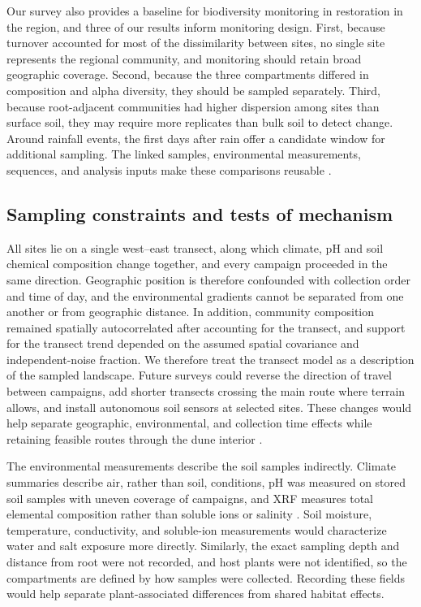 \documentclass[fleqn,10pt,numbers]{olplainarticle}
\begin{document}
Our survey also provides a baseline for biodiversity monitoring in restoration in the region, and three of our results inform monitoring design. First, because turnover accounted for most of the dissimilarity between sites, no single site represents the regional community, and monitoring should retain broad geographic coverage. Second, because the three compartments differed in composition and alpha diversity, they should be sampled separately. Third, because root-adjacent communities had higher dispersion among sites than surface soil, they may require more replicates than bulk soil to detect change. Around rainfall events, the first days after rain offer a candidate window for additional sampling. The linked samples, environmental measurements, sequences, and analysis inputs make these comparisons reusable \cite{rubalkhali_datapaper}.


\subsection*{Sampling constraints and tests of mechanism}

All sites lie on a single west--east transect, along which climate, pH and soil chemical composition change together, and every campaign proceeded in the same direction. Geographic position is therefore confounded with collection order and time of day, and the environmental gradients cannot be separated from one another or from geographic distance. In addition, community composition remained spatially autocorrelated after accounting for the transect, and support for the transect trend depended on the assumed spatial covariance and independent-noise fraction. We therefore treat the transect model as a description of the sampled landscape. Future surveys could reverse the direction of travel between campaigns, add shorter transects crossing the main route where terrain allows, and install autonomous soil sensors at selected sites. These changes would help separate geographic, environmental, and collection time effects while retaining feasible routes through the dune interior \cite{edgell2006arabian}.

The environmental measurements describe the soil samples indirectly. Climate summaries describe air, rather than soil, conditions, pH was measured on stored soil samples with uneven coverage of campaigns, and XRF measures total elemental composition rather than soluble ions or salinity \cite{elmoatassem2025pxrf}. Soil moisture, temperature, conductivity, and soluble-ion measurements would characterize water and salt exposure more directly. Similarly, the exact sampling depth and distance from root were not recorded, and host plants were not identified, so the compartments are defined by how samples were collected. Recording these fields would help separate plant-associated differences from shared habitat effects.
\end{document}

